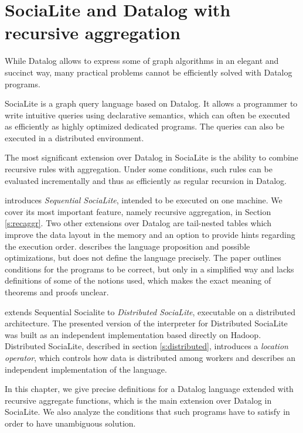 
\chapter{SociaLite and Datalog with recursive aggregation}\label{r:socialite}

While Datalog allows to express some of graph algorithms
in an elegant and succinct way, many practical problems cannot be efficiently solved with Datalog programs.

SociaLite \cite{socialite, distsoc} is a graph query language based on Datalog.  It allows a programmer to write intuitive queries using declarative semantics, which can often be executed as efficiently as highly optimized dedicated programs. The queries can also be executed in a distributed environment.

The most significant extension over Datalog in SociaLite is the ability to combine recursive rules with aggregation. Under some conditions, such rules can be evaluated incrementally and thus as efficiently as regular recursion in Datalog.

\cite{socialite} introduces \emph{Sequential SociaLite}, intended to be executed on one machine. We cover its most important feature, namely recursive aggregation, in Section \ref{s:recaggr}. Two other extensions over Datalog are tail-nested tables which improve the data layout in the memory and an option to provide hints regarding the execution order. \cite{socialite} describes the language proposition and possible optimizations, but does not define the language precisely. The paper outlines conditions for the programs to be correct, but only in a simplified way and lacks definitions of some of the notions used, which makes the exact meaning of theorems and proofs unclear.

\cite{distsoc} extends Sequential Socialite to \emph{Distributed SociaLite}, executable on a distributed architecture. The presented version of the interpreter for Distributed SociaLite was built as an independent implementation based directly on Hadoop. Distributed SociaLite, described in section \ref{s:distributed}, introduces a \emph{location operator}, which controls how data is distributed among workers and describes an independent implementation of the language. 

In this chapter, we give precise definitions for a Datalog language extended with recursive aggregate functions, which is the main extension over Datalog in SociaLite. We also analyze the conditions that such programs have to satisfy in order to have unambiguous solution.

